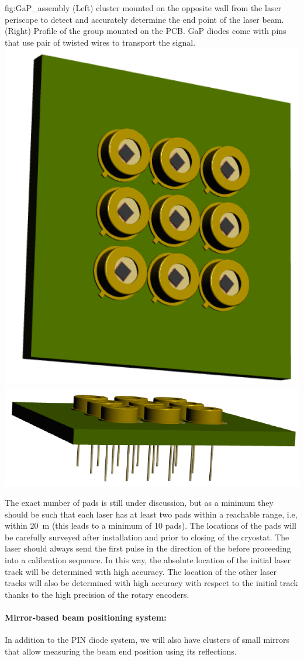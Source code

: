\begin{dunefigure}{fig:GaP_assembly}
{(Left)  cluster mounted on the opposite wall from the laser periscope to detect and accurately determine the end point of the laser beam. (Right)
Profile of the  group mounted on the PCB. GaP diodes come with pins that use pair of twisted wires to transport the signal.}
\includegraphics[width=0.35\linewidth]{graphics/GaP_assembly.png} 
\includegraphics[width=0.45\linewidth]{graphics/GaP_assembly_profile.png} 
\end{dunefigure}

The exact number of pads is still under discussion, but as a minimum they should be such that each laser has at least two pads within a reachable range, i.e, within \SI{20}{\m} (this leads to a minimum of 10 pads). The locations of the pads will be carefully surveyed after installation and prior to closing of the cryostat. The laser should always send the first pulse in the direction of the  before proceeding into a calibration sequence. In this way, the absolute location of the initial laser track will be determined with high accuracy. The location of the other laser tracks will also be determined with high accuracy with respect to the initial track thanks to the high precision of the rotary encoders.



\paragraph{Mirror-based beam positioning system:}

In addition to the PIN diode system, we will also have clusters of small mirrors that allow measuring the beam end position using its reflections.

